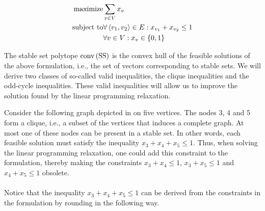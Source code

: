 {\begin{eqnarray}
\mbox{maximize}&\sumdomain[v]{V}{x_v}\eqnlab{stablesetr-m}\\
\mbox{subject to}&\forall\tupl{v_1,v_2}\in E:x_{v_1}+x_{v_2}\leq 1\eqnlab{stablesetr-c1}\\
&\forall v\in V:x_v\in\accl{0,1}\eqnlab{stablesetr-c2}
\end{eqnarray}

The stable set polytope $\mbox{conv}\left( \mbox{SS} \right)$ is the convex hull of the feasible solutions of the above formulation, i.e., the set of vectors corresponding to stable sets. We will derive two classes of so-called valid inequalities, the clique inequalities and the odd-cycle inequalities. These valid inequalities will allow us to improve the solution found by the linear programming relaxation.

\begin{example}
Consider the following graph depicted in  on five vertices. The nodes 3, 4 and 5 form a clique, i.e., a subset of the vertices that induces a complete graph. At most one of these nodes can be present in a stable set. In other words, each feasible solution must satisfy the inequality $x_3+x_4+x_5\leq 1$. Thus, when solving the linear programming relaxation, one could add this constraint to the formulation, thereby making the constraints $x_3+x_4\leq 1$, $x_3+x_5\leq 1$ and $x_4+x_5\leq 1$ obsolete.


\paragraph{}
Notice that the inequality $x_3+x_4+x_5\leq 1$ can be derived from the constraints in the formulation by rounding in the following way.


\end{example}}
